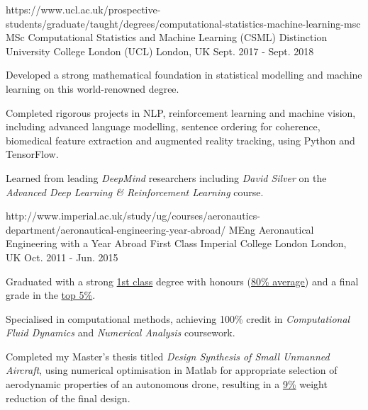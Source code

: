 

\begin{cventries}


  \cventry
    {https://www.ucl.ac.uk/prospective-students/graduate/taught/degrees/computational-statistics-machine-learning-msc}
    {MSc Computational Statistics and Machine Learning (CSML)} %
    {Distinction}
    {University College London (UCL)} %
    {London, UK} %
    {Sept. 2017 - Sept. 2018} %
    {
      \begin{cvitems} %
        \item {Developed a strong mathematical foundation in statistical modelling and machine learning on this world-renowned degree.}
        \item {Completed rigorous projects in NLP, reinforcement learning and machine vision, including advanced language modelling, sentence ordering for coherence, biomedical feature extraction and augmented reality tracking, using Python and TensorFlow.}
        \item {Learned from leading \emph{DeepMind} researchers including \emph{David Silver} on the \emph{Advanced Deep Learning \& Reinforcement Learning} course.}
      \end{cvitems}
    }
    
  \cventry
    {http://www.imperial.ac.uk/study/ug/courses/aeronautics-department/aeronautical-engineering-year-abroad/}
    {MEng Aeronautical Engineering with a Year Abroad} %
    {First Class}
    {Imperial College London} %
    {London, UK} %
    {Oct. 2011 - Jun. 2015} %
    {
      \begin{cvitems} %
        \item {Graduated with a strong \underline{1st class} degree with honours (\underline{80\% average}) and a final grade in the \underline{top 5\%}.}
        \item {Specialised in computational methods, achieving 100\% credit in \emph{Computational Fluid Dynamics} and \emph{Numerical Analysis} coursework.}
        \item {Completed my Master's thesis titled \emph{Design Synthesis of Small Unmanned Aircraft}, using numerical optimisation in Matlab for appropriate selection of aerodynamic properties of an autonomous drone, resulting in a \underline{9\%} weight reduction of the final design.}
      \end{cvitems}
    }


\end{cventries}
